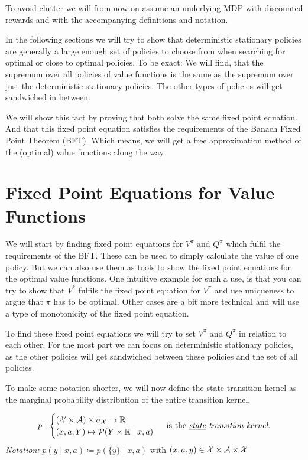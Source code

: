 To avoid clutter we will from now on assume an underlying MDP with discounted rewards and with the accompanying definitions and notation.

In the following sections we will try to show that deterministic stationary policies are generally a large enough set of policies to choose from when searching for optimal or close to optimal policies. To be exact: We will find, that the supremum over all policies of value functions is the same as the supremum over just the deterministic stationary policies. The other types of policies will get sandwiched in between.

We will show this fact by proving that both solve the same fixed point equation. And that this fixed point equation satisfies the requirements of the Banach Fixed Point Theorem (BFT). Which means, we will get a free approximation method of the (optimal) value functions along the way.

\section{Fixed Point Equations for Value Functions}
We will start by finding fixed point equations for \(V^\pi\) and \(Q^\pi\) which fulfil the requirements of the BFT. These can be used to simply calculate the value of one policy. But we can also use them as tools to show the fixed point equations for the optimal value functions. One intuitive example for such a use, is that you can try to show that \(V^*\) fulfils the fixed point equation for \(V^\pi\) and use uniqueness to argue that \(\pi\) has to be optimal. Other cases are a bit more technical and will use a type of monotonicity of the fixed point equation.

To find these fixed point equations we will try to set \(V^\pi\) and \(Q^\pi\) in relation to each other. For the most part we can focus on deterministic stationary policies, as the other policies will get sandwiched between these policies and the set of all policies.

To make some notation shorter, we will now define the state transition kernel as the marginal probability distribution of the entire transition kernel.

\begin{definition}\leavevmode
\begin{align*}
	p\colon 
	\begin{cases}
		(\mathcal{X}\times\mathcal{A})\times\sigma_{\mathcal{X}}\to\mathbb{R}\\
		(x,a,Y)\mapsto \mathcal{P}(Y\times\mathbb{R}\mid x,a)
	\end{cases}\text{ is the \emph{\underline{state} transition kernel}.}
\end{align*}
\emph{Notation:} \(p(y\mid x,a)\coloneqq p(\{y\}\mid x,a)\) with \((x,a,y)\in\mathcal{X}\times\mathcal{A}\times\mathcal{X}\)
\end{definition}

